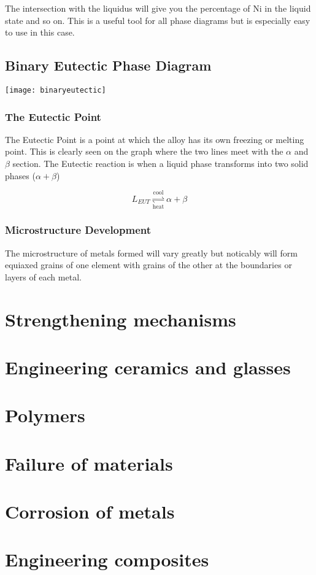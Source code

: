 \documentclass[12pt]{article}
\begin{document}
The intersection with the liquidus will give you the percentage of Ni in the liquid state and so on.
This is a useful tool for all phase diagrams but is especially easy to use in this case.


\subsection{Binary Eutectic Phase Diagram}
\begin{center}
  \texttt{[image: binaryeutectic]}
\end{center}

\subsubsection{The Eutectic Point}
The Eutectic Point is a point at which the alloy has its own freezing or melting point.
This is clearly seen on the graph where the two lines meet with the $\alpha$ and $\beta$ section.
The Eutectic reaction is when a liquid phase transforms into two solid phases ($\alpha+\beta$)

\begin{equation*}
  L_{EUT} \underset{\text{heat}}{\stackrel{\text{cool}}{\rightleftharpoons}} \alpha + \beta 
\end{equation*}

\subsubsection{Microstructure Development}
The microstructure of metals formed will vary greatly but noticably will form equiaxed grains of one element with grains of the other at the boundaries or layers of each metal.

\section{Strengthening mechanisms}
\section{Engineering ceramics and glasses}
\section{Polymers}
\section{Failure of materials}
\section{Corrosion of metals}
\section{Engineering composites}
\end{document}
